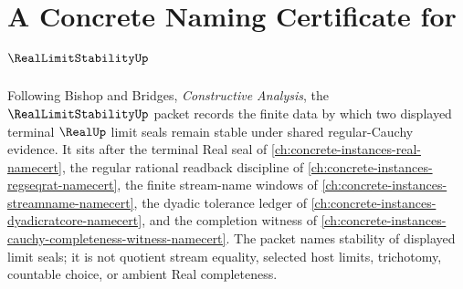 \chapter{A Concrete Naming Certificate for $\RealLimitStabilityUp$}
\label{ch:concrete-instances-real-limit-stability-namecert}

Following Bishop and Bridges, \emph{Constructive Analysis}, the $\RealLimitStabilityUp$ packet records the finite data by which two displayed terminal $\RealUp$ limit seals remain stable under shared regular-Cauchy evidence. It sits after the terminal Real seal of \autoref{ch:concrete-instances-real-namecert}, the regular rational readback discipline of \autoref{ch:concrete-instances-regseqrat-namecert}, the finite stream-name windows of \autoref{ch:concrete-instances-streamname-namecert}, the dyadic tolerance ledger of \autoref{ch:concrete-instances-dyadicratcore-namecert}, and the completion witness of \autoref{ch:concrete-instances-cauchy-completeness-witness-namecert}. The packet names stability of displayed limit seals; it is not quotient stream equality, selected host limits, trichotomy, countable choice, or ambient Real completeness.


